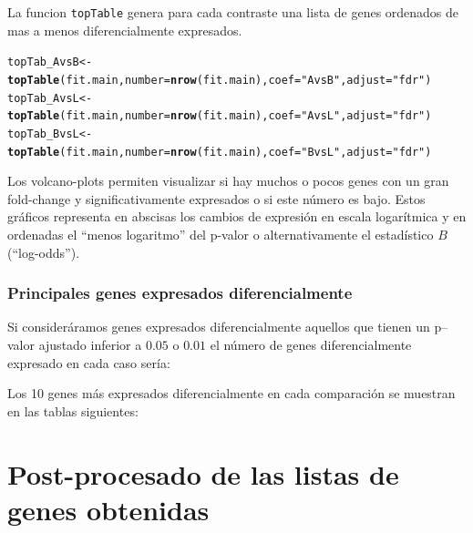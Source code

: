 \documentclass[a4paper]{article}\usepackage[]{graphicx}\usepackage[]{color}
\makeatletter
\newcommand{\hlstr}[1]{\textcolor[rgb]{0.192,0.494,0.8}{#1}}%
\newcommand{\hlstd}[1]{\textcolor[rgb]{0.345,0.345,0.345}{#1}}%
\newcommand{\hlkwb}[1]{\textcolor[rgb]{0.69,0.353,0.396}{#1}}%
\newcommand{\hlkwc}[1]{\textcolor[rgb]{0.333,0.667,0.333}{#1}}%
\newcommand{\hlkwd}[1]{\textcolor[rgb]{0.737,0.353,0.396}{\textbf{#1}}}%
\newenvironment{kframe}{%
 \def\at@end@of@kframe{}%
 \ifinner\ifhmode%
  \def\at@end@of@kframe{\end{minipage}}%
  \begin{minipage}{\columnwidth}%
 \fi\fi%
 \def\FrameCommand##1{\hskip\@totalleftmargin \hskip-\fboxsep
 \colorbox{shadecolor}{##1}\hskip-\fboxsep
     \hskip-\linewidth \hskip-\@totalleftmargin \hskip\columnwidth}%
 \MakeFramed {\advance\hsize-\width
   \@totalleftmargin\z@ \linewidth\hsize
   \@setminipage}}%
 {\par\unskip\endMakeFramed%
 \at@end@of@kframe}
\newenvironment{knitrout}{}{} %
\makeatother
\begin{document}
La funcion \texttt{topTable} genera para cada contraste una lista de genes 
ordenados de mas a menos diferencialmente expresados.

\begin{knitrout}
\color{fgcolor}\begin{kframe}
\begin{alltt}
\hlstd{topTab_AvsB} \hlkwb{<-} \hlkwd{topTable} \hlstd{(fit.main,} \hlkwc{number}\hlstd{=}\hlkwd{nrow}\hlstd{(fit.main),} \hlkwc{coef}\hlstd{=}\hlstr{"AvsB"}\hlstd{,} \hlkwc{adjust}\hlstd{=}\hlstr{"fdr"}\hlstd{)}
\hlstd{topTab_AvsL} \hlkwb{<-} \hlkwd{topTable} \hlstd{(fit.main,} \hlkwc{number}\hlstd{=}\hlkwd{nrow}\hlstd{(fit.main),} \hlkwc{coef}\hlstd{=}\hlstr{"AvsL"}\hlstd{,} \hlkwc{adjust}\hlstd{=}\hlstr{"fdr"}\hlstd{)}
\hlstd{topTab_BvsL}  \hlkwb{<-} \hlkwd{topTable} \hlstd{(fit.main,} \hlkwc{number}\hlstd{=}\hlkwd{nrow}\hlstd{(fit.main) ,} \hlkwc{coef}\hlstd{=}\hlstr{"BvsL"}\hlstd{,} \hlkwc{adjust}\hlstd{=}\hlstr{"fdr"}\hlstd{)}
\end{alltt}
\end{kframe}
\end{knitrout}

Los volcano-plots permiten visualizar si hay muchos o pocos genes con un gran fold-change y significativamente expresados o si este número es bajo. Estos gráficos representa en abscisas los cambios de expresión en escala logarítmica
y en ordenadas el ``menos logaritmo'' del p-valor o alternativamente el estadístico $B$ (``log-odds'').




\subsubsection{Principales genes expresados diferencialmente}

Si consideráramos genes expresados diferencialmente aquellos que tienen un p--valor ajustado inferior a $0.05$ o $0.01$ el número de genes diferencialmente expresado en cada caso sería:




Los 10 genes más expresados diferencialmente en cada comparaci\'on se muestran en las tablas siguientes:








\section{Post-procesado de las listas de genes obtenidas}
\end{document}
